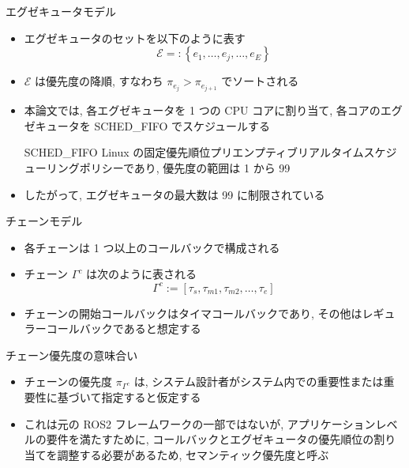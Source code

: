 \begin{frame}{エグゼキュータモデル}
    \begin{itemize}
        \item エグゼキュータのセットを以下のように表す
              \vspace{-2mm}
              \begin{equation*}
                  \mathcal{E}=:\left\{e_{1}, \ldots, e_{j}, \ldots, e_{E}\right\}
              \end{equation*}

        \item $\mathcal{E}$ は優先度の降順, すなわち $\pi_{e_{j}}>\pi_{e_{j+1}}$ でソートされる
        \item 本論文では, 各エグゼキュータを 1 つの CPU コアに割り当て, 各コアのエグゼキュータを SCHED\_FIFO でスケジュールする
              \begin{block}{SCHED\_FIFO}
                  Linux の固定優先順位プリエンプティブリアルタイムスケジューリングポリシーであり, 優先度の範囲は 1 から 99
              \end{block}
              \vspace{5mm}
        \item したがって, エグゼキュータの最大数は 99 に制限されている
    \end{itemize}
\end{frame}

\begin{frame}{チェーンモデル}
    \begin{itemize}
        \item 各チェーンは 1 つ以上のコールバックで構成される
        \item チェーン $\Gamma^{c}$ は次のように表される
              \vspace{-2mm}
              \begin{equation*}
                  \Gamma^{c}:=\left[\tau_{s}, \tau_{m 1}, \tau_{m 2}, \ldots, \tau_{e}\right]
              \end{equation*}
        \item チェーンの開始コールバックはタイマコールバックであり, その他はレギュラーコールバックであると想定する
    \end{itemize}
\end{frame}

\begin{frame}{チェーン優先度の意味合い}
    \begin{itemize}
        \item チェーンの優先度 $\pi_{\Gamma^{c}}$ は, システム設計者がシステム内での重要性または重要性に基づいて指定すると仮定する
        \item これは元の ROS2 フレームワークの一部ではないが, アプリケーションレベルの要件を満たすために, コールバックとエグゼキュータの優先順位の割り当てを調整する必要があるため, セマンティック優先度と呼ぶ
    \end{itemize}
\end{frame}
